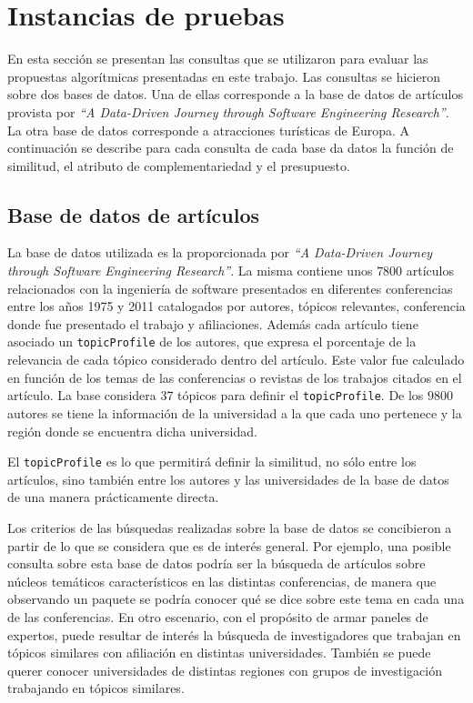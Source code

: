 \section{Instancias de pruebas}\label{sect:busquedas}
En esta sección se presentan las consultas que se utilizaron para evaluar las propuestas algorítmicas presentadas en este trabajo. Las consultas se hicieron sobre dos bases de datos. Una de ellas corresponde a la base de datos de artículos provista por \textit{\textquotedblleft A Data-Driven Journey through Software Engineering Research\textquotedblright}\cite{dataDrive}. La otra base de datos corresponde a atracciones turísticas de Europa. A continuación se describe para cada consulta de cada base da datos la función de similitud, el atributo de complementariedad y el presupuesto. 

\subsection{Base de datos de artículos}
La base de datos utilizada es la proporcionada por \textit{\textquotedblleft A Data-Driven Journey through Software Engineering Research\textquotedblright}\cite{dataDrive}. La misma contiene unos $7800$ artículos relacionados con la ingeniería de software presentados en diferentes conferencias entre los años 1975 y 2011 catalogados por autores, tópicos relevantes, conferencia donde fue presentado el trabajo y afiliaciones. Además cada artículo tiene asociado un \texttt{topicProfile} de los autores, que expresa el porcentaje de la relevancia de cada tópico considerado dentro del artículo. Este valor fue calculado en función de los temas de las conferencias o revistas de los trabajos citados en el artículo. La base considera 37 tópicos para definir el \texttt{topicProfile}. De los $9800$ autores se tiene la información de la universidad a la que cada uno pertenece y la región donde se encuentra dicha universidad.

El \texttt{topicProfile} es lo que permitirá definir la similitud, no sólo entre los artículos, sino también entre los autores y las universidades de la base de datos de una manera prácticamente directa.

Los criterios de las búsquedas realizadas sobre la base de datos se concibieron a partir de lo que se considera que es de interés general. Por ejemplo, una posible consulta sobre esta base de datos podría ser la búsqueda de artículos sobre núcleos temáticos característicos en las distintas conferencias, de manera que observando un paquete se podría conocer qué se dice sobre este tema en cada una de las conferencias. En otro escenario, con el propósito de armar paneles de expertos, puede resultar de interés la búsqueda de investigadores que trabajan en tópicos similares con afiliación en distintas universidades. También se puede querer conocer universidades de distintas regiones con grupos de investigación trabajando en tópicos similares.

